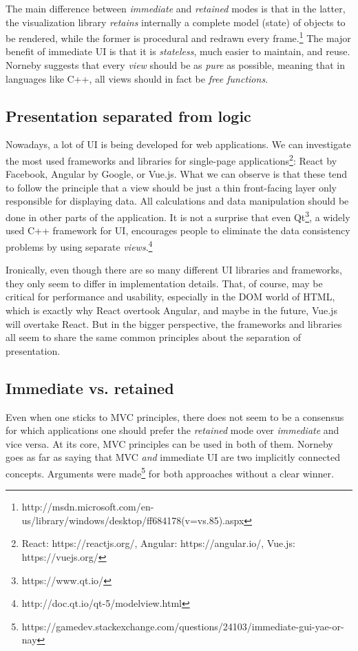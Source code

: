 The main difference between \emph{immediate} and \emph{retained} modes is that in the latter, the visualization library \emph{retains} internally a complete model (state) of objects to be rendered, while the former is procedural and redrawn every frame.\footnote{http://msdn.microsoft.com/en-us/library/windows/desktop/ff684178(v=vs.85).aspx}
The major benefit of immediate UI is that it is \emph{stateless}, much easier to maintain, and reuse.
Norneby suggests that every \emph{view} should be as \emph{pure} as possible, meaning that in languages like C++, all views should in fact be \emph{free functions}.

\subsection{Presentation separated from logic}

Nowadays, a lot of UI is being developed for web applications.
We can investigate the most used frameworks and libraries for single-page applications\footnote{React: https://reactjs.org/, Angular: https://angular.io/, Vue.js: https://vuejs.org/}: React by Facebook, Angular by Google, or Vue.js.
What we can observe is that these tend to follow the principle that a view should be just a thin front-facing layer only responsible for displaying data.
All calculations and data manipulation should be done in other parts of the application.
It is not a surprise that even Qt\footnote{https://www.qt.io/}, a widely used C++ framework for UI, encourages people to eliminate the data consistency problems by using separate \emph{views}.\footnote{http://doc.qt.io/qt-5/modelview.html}

Ironically, even though there are so many different UI libraries and frameworks, they only seem to differ in implementation details.
That, of course, may be critical for performance and usability, especially in the DOM world of HTML, which is exactly why React overtook Angular, and maybe in the future, Vue.js will overtake React.
But in the bigger perspective, the frameworks and libraries all seem to share the same common principles about the separation of presentation.

\subsection{Immediate vs. retained}

Even when one sticks to MVC principles, there does not seem to be a consensus for which applications one should prefer the \emph{retained} mode over \emph{immediate} and vice versa.
At its core, MVC principles can be used in both of them.
Norneby goes as far as saying that MVC \emph{and} immediate UI are two implicitly connected concepts.
Arguments were made\footnote{https://gamedev.stackexchange.com/questions/24103/immediate-gui-yae-or-nay} for both approaches without a clear winner.


